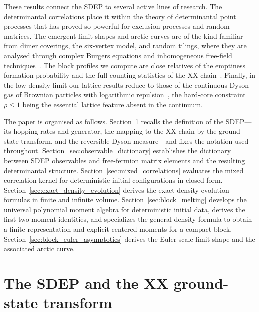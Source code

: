 \documentclass[11pt]{article}
\numberwithin{equation}{section}
\newcommand{\1}{\mathbf 1}
\begin{document}
These results connect the SDEP to several active lines of research.  The
determinantal correlations place it within the theory of determinantal point
processes that has proved so powerful for exclusion processes and random
matrices. The emergent limit shapes and arctic curves are of the kind familiar
from dimer coverings, the six-vertex model, and random tilings, where they are
analysed through complex Burgers equations and inhomogeneous free-field
techniques~\cite{KenyonOkounkov2007,AllegraDubailStephanViti2016,Gorin2021,ColomoPronko2010,StephanLectureNotes2021,DiFrancescoGuitter2019,PallisterGangardtAbanov2022}.
The block profiles we compute are close relatives of the emptiness formation
probability and the full counting statistics of the XX
chain~\cite{Abanov2006,AbanovFranchini2003,StephanEFP2014,PallisterEtAl2025}.
Finally, in the low-density limit our lattice results reduce to those of the
continuous Dyson gas of Brownian particles with logarithmic
repulsion~\cite{AndrausKatori2016,DandekarKrapivskyMallick2023,DandekarKrapivskyMallick2024,KrapivskyMallick2025},
the hard-core constraint $\rho\le1$ being the essential lattice feature absent in
the continuum.

The paper is organised as follows.
Section~\ref{sec:sdep_xx_transform} recalls the definition of the SDEP---its
hopping rates and generator, the mapping to the XX chain by the ground-state
transform, and the reversible Dyson measure---and fixes the notation used
throughout.  Section~\ref{sec:observable_dictionary} establishes the dictionary
between SDEP observables and free-fermion matrix elements and the resulting
determinantal structure.  Section~\ref{sec:mixed_correlations} evaluates the
mixed correlation kernel for deterministic initial configurations in closed form.
Section~\ref{sec:exact_density_evolution} derives the exact density-evolution
formulas in finite and infinite volume.  Section~\ref{sec:block_melting}
develops the universal polynomial moment algebra for deterministic initial data,
derives the first two moment identities, and specializes the general density
formula to obtain a finite representation and explicit centered moments for a
compact block.
Section~\ref{sec:block_euler_asymptotics} derives the Euler-scale limit shape
and the associated arctic curve.

\section{The SDEP and the XX ground-state transform}
\label{sec:sdep_xx_transform}
\end{document}
